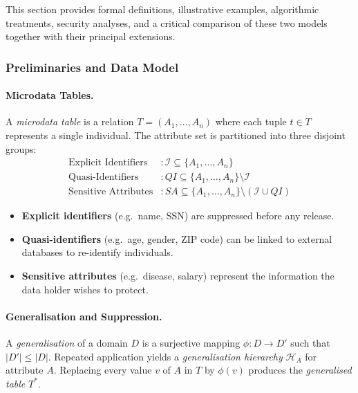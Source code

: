 This section provides formal definitions, illustrative examples, algorithmic treatments, security analyses, and a critical comparison of these two models together with their principal extensions.

\subsubsection{Preliminaries and Data Model}
\label{sec:data_model}

\paragraph{Microdata Tables.}

A \emph{microdata table} is a relation $T = (A_1, \ldots, A_n)$ where each tuple $t \in T$ represents a single individual. The attribute set is partitioned into three disjoint groups:
\begin{align*}
  \text{Explicit Identifiers} &: \mathcal{I} \subseteq \{A_1,\ldots,A_n\}\\
  \text{Quasi-Identifiers}    &: QI \subseteq \{A_1,\ldots,A_n\} \setminus \mathcal{I}\\
  \text{Sensitive Attributes} &: SA \subseteq \{A_1,\ldots,A_n\} \setminus (\mathcal{I}\cup QI)
\end{align*}

\begin{itemize}
  \item \textbf{Explicit identifiers} (e.g.\ name, SSN) are suppressed before any release.
  \item \textbf{Quasi-identifiers} (e.g.\ age, gender, ZIP code) can be linked to external databases to re-identify individuals.
  \item \textbf{Sensitive attributes} (e.g.\ disease, salary) represent the information the data holder wishes to protect.
\end{itemize}

\paragraph{Generalisation and Suppression.}

A \emph{generalisation} of a domain $D$ is a surjective mapping $\phi: D \to D'$ such that $|D'| \leq |D|$. Repeated application yields a \emph{generalisation hierarchy} $\mathcal{H}_A$ for attribute $A$. Replacing every value $v$ of $A$ in $T$ by $\phi(v)$ produces the \emph{generalised table} $T^{*}$.


